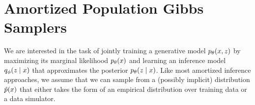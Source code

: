 \documentclass{article}
\theoremstyle{definition}
\begin{document}



\section{Amortized Population Gibbs Samplers}
\label{sec:amortized-gibbs}
We are interested in the task of jointly training a generative model $p_\theta(x, z)$ by maximizing its marginal likelihood $p_\theta(x)$ and learning an inference model $q_\phi(z \mid x)$ that approximates the posterior $p_\theta(z \mid x)$. Like most amortized inference approaches, we assume that we can sample from a (possibly implicit) distribution $\hat{p}(x)$ that either takes the form of an empirical distribution over training data or a data simulator.
\end{document}

